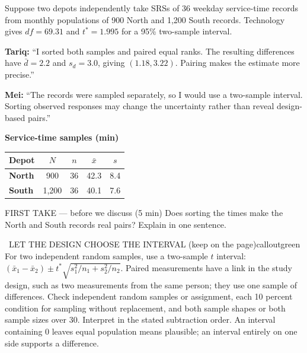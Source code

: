 \documentclass[11pt]{article}
\begin{document}


Suppose two depots independently take SRSs of 36 weekday service-time records from monthly populations of 900 North and 1,200 South records. Technology gives $df=69.31$ and $t^*=1.995$ for a 95\% two-sample interval.\par\smallskip \textbf{Tariq:} ``I sorted both samples and paired equal ranks. The resulting differences have $\bar d=2.2$ and $s_d=3.0$, giving $(1.18,3.22)$. Pairing makes the estimate more precise.''\par \textbf{Mei:} ``The records were sampled separately, so I would use a two-sample interval. Sorting observed responses may change the uncertainty rather than reveal design-based pairs.''\par
\begin{center}
\textbf{Service-time samples (min)}\par\smallskip
\begin{tabular}{|l|c|c|c|c|}
\hline
\textbf{Depot} & \textbf{$N$} & \textbf{$n$} & \textbf{$\bar x$} & \textbf{$s$} \\ \hline
\textbf{North} & 900 & 36 & 42.3 & 8.4 \\ \hline
\textbf{South} & 1,200 & 36 & 40.1 & 7.6 \\ \hline
\end{tabular}
\end{center}
\begin{firsttakebox}{FIRST TAKE --- before we discuss (5 min)}
Does sorting the times make the North and South records real pairs? Explain in one sentence.
\workspace{0.9in}
\end{firsttakebox}

\begin{callout}{\IconBook\ LET THE DESIGN CHOOSE THE INTERVAL (keep on the page)}{calloutgreen}
For two independent random samples, use a two-sample $t$ interval:
$(\bar x_1-\bar x_2)\pm t^*\sqrt{s_1^2/n_1+s_2^2/n_2}$. Paired measurements have a link
in the study design, such as two measurements from the same person; they use one sample of differences.
Check independent random samples or assignment, each 10 percent condition for sampling without replacement,
and both sample shapes or both sample sizes over 30. Interpret in the stated subtraction order.
An interval containing 0 leaves equal population means plausible; an interval entirely on one side supports a difference.
\end{callout}
\end{document}
